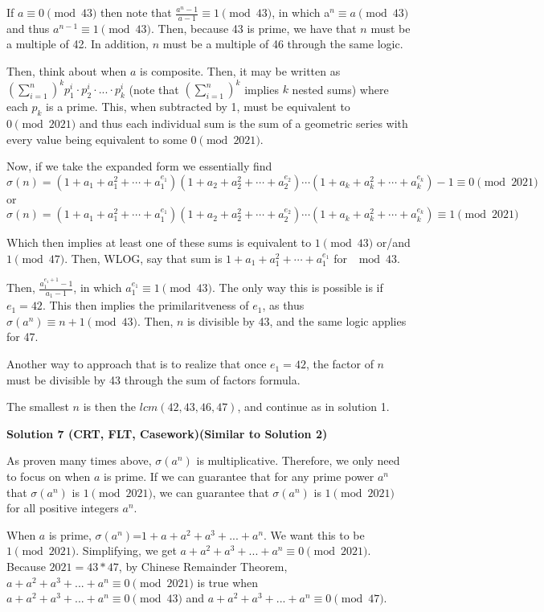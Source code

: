 \begin{enumerate}
 If $a \equiv 0 \pmod{43}$ then note that $\frac{a^n - 1}{a - 1} \equiv 1 \pmod{43}$, in which a$^n \equiv a \pmod{43}$ and thus $a^{n-1} \equiv 1 \pmod{43}$. Then, because 43 is prime, we have that $n$ must be a multiple of 42. In addition, $n$ must be a multiple of 46 through the same logic.

 Then, think about when $a$ is composite. Then, it may be written as $(\sum_{i=1}^{n})^k p^{i}_1 \cdot p^{i}_2 \cdot ... \cdot p^{i}_k$ (note that $(\sum_{i=1}^{n})^k$ implies $k$ nested sums) where each $p_k$ is a prime. This, when subtracted by 1, must be equivalent to $0 \pmod{2021}$ and thus each individual sum is the sum of a geometric series with every value being equivalent to some $0 \pmod{2021}$. 

 Now, if we take the expanded form we essentially find
 \[\sigma(n) = (1 + a_1 + a_1^2 + \cdots + a_1^{e_1}) (1 + a_2 + a_2^2 + \cdots + a_2^{e_2}) \cdots (1 + a_k + a_k^2 + \cdots + a_k^{e_k}) - 1 \equiv 0 \pmod {2021}\]or 
 \[\sigma(n) = (1 + a_1 + a_1^2 + \cdots + a_1^{e_1}) (1 + a_2 + a_2^2 + \cdots + a_2^{e_2}) \cdots (1 + a_k + a_k^2 + \cdots + a_k^{e_k}) \equiv 1 \pmod {2021}\]

 Which then implies at least one of these sums is equivalent to $1\pmod{43}$ or/and $1 \pmod{47}$. Then, WLOG, say that sum is $1 + a_1 + a_1^2 + \cdots + a_1^{e_1}$ for $\mod 43$.

 Then, $\frac{a_1^{e_1+1}-1}{a_1 - 1}$, in which $a_1^{e_1} \equiv 1 \pmod{43}$. The only way this is possible is if $e_1 = 42$. This then implies the primilaritveness of $e_1$, as thus $\sigma(a^n) \equiv n+1 \pmod{43}$. Then, $n$ is divisible by 43, and the same logic applies for 47.

 Another way to approach that is to realize that once $e_1 = 42$, the factor of $n$ must be divisible by 43 through the sum of factors formula.

 The smallest $n$ is then the $lcm(42,43,46,47)$, and continue as in solution 1.

 



\textbf{Solution 7 (CRT, FLT, Casework)(Similar to Solution 2)}

As proven many times above, $\sigma(a^n)$ is multiplicative. Therefore, we only need to focus on when $a$ is prime. If we can guarantee that for any prime power $a^n$ that $\sigma(a^n)$ is $1\pmod{2021}$, we can guarantee that $\sigma(a^n)$ is $1\pmod{2021}$ for all positive integers $a^n$.

 When $a$ is prime, $\sigma(a^n)$=$1+a+a^2+a^3+...+a^n$. We want this to be $1\pmod{2021}$. Simplifying, we get $a+a^2+a^3+...+a^n\equiv 0\pmod{2021}$. Because $2021=43*47$, by Chinese Remainder Theorem, $a+a^2+a^3+...+a^n\equiv 0\pmod{2021}$ is true when $a+a^2+a^3+...+a^n\equiv 0\pmod{43}$ and $a+a^2+a^3+...+a^n\equiv 0\pmod{47}$.


\end{enumerate}

